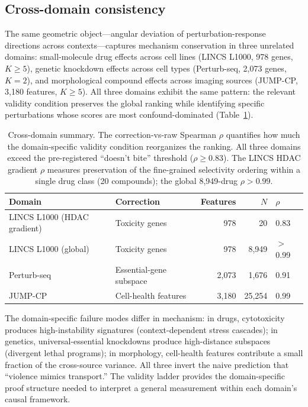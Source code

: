 \documentclass{article}
\begin{document}
\subsection{Cross-domain consistency}

The same geometric object---angular deviation of perturbation-response
directions across contexts---captures mechanism conservation in three
unrelated domains: small-molecule drug effects across cell lines (LINCS
L1000, 978 genes, $K \geq 5$), genetic knockdown effects across
cell types (Perturb-seq, 2{,}073 genes, $K = 2$), and morphological
compound effects across imaging sources (JUMP-CP, 3{,}180 features,
$K \geq 5$). All three domains exhibit the same pattern: the relevant
validity condition preserves the global ranking while identifying specific
perturbations whose scores are most confound-dominated
(Table~\ref{tab:cross_domain}).

\begin{table}[t]
\centering
\caption{Cross-domain summary. The correction-vs-raw Spearman $\rho$
quantifies how much the domain-specific validity condition reorganizes
the ranking. All three domains exceed the pre-registered ``doesn't bite''
threshold ($\rho \geq 0.83$). The LINCS HDAC gradient $\rho$ measures
preservation of the fine-grained selectivity ordering within a single drug
class (20 compounds); the global 8{,}949-drug $\rho > 0.99$.}
\label{tab:cross_domain}
\small
\begin{tabular}{llrrl}
\toprule
Domain & Correction & Features & $N$ & $\rho$ \\
\midrule
LINCS L1000 (HDAC gradient) & Toxicity genes & 978 & 20 & 0.83 \\
LINCS L1000 (global) & Toxicity genes & 978 & 8{,}949 & $>$0.99 \\
Perturb-seq & Essential-gene subspace & 2{,}073 & 1{,}676 & 0.91 \\
JUMP-CP & Cell-health features & 3{,}180 & 25{,}254 & 0.99 \\
\bottomrule
\end{tabular}
\end{table}

The domain-specific failure modes differ in mechanism: in drugs, cytotoxicity
produces high-instability signatures (context-dependent stress cascades); in
genetics, universal-essential knockdowns produce high-distance subspaces
(divergent lethal programs); in morphology, cell-health features contribute
a small fraction of the cross-source variance. All three invert the naive
prediction that ``violence mimics transport.'' The validity ladder provides
the domain-specific proof structure needed to interpret a general measurement
within each domain's causal framework.
\end{document}
